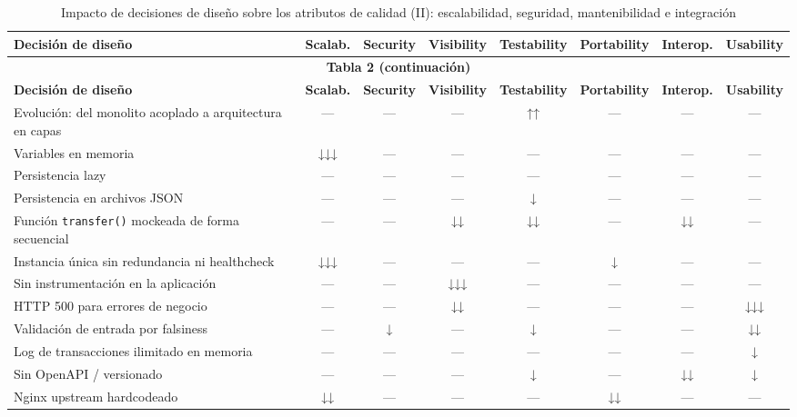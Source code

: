 \begingroup
\renewcommand*{\arraystretch}{1.2}
\setlength{\tabcolsep}{2.5pt}   %
\footnotesize                    %
\begin{longtable}{@{}l|c|c|c|c|c|c|c@{}}
\caption{Impacto de decisiones de diseño sobre los atributos de calidad (II): escalabilidad, seguridad, mantenibilidad e integración}\\
\toprule
\textbf{Decisión de diseño} & \textbf{Scalab.} & \textbf{Security} & \textbf{Visibility} & \textbf{Testability} & \textbf{Portability} & \textbf{Interop.} & \textbf{Usability} \\
\midrule
\endfirsthead
\multicolumn{8}{c}{{\bfseries Tabla 2 (continuación)}} \\
\toprule
\textbf{Decisión de diseño} & \textbf{Scalab.} & \textbf{Security} & \textbf{Visibility} & \textbf{Testability} & \textbf{Portability} & \textbf{Interop.} & \textbf{Usability} \\
\midrule
\endhead
\bottomrule
\endfoot
Evolución: del monolito acoplado a arquitectura en capas & — & — & — & ↑↑ & — & — & — \\
Variables en memoria & ↓↓↓ & — & — & — & — & — & — \\
Persistencia lazy & — & — & — & — & — & — & — \\
Persistencia en archivos JSON & — & — & — & ↓ & — & — & — \\
Función \texttt{transfer()} mockeada de forma secuencial & — & — & ↓↓ & ↓↓ & — & ↓↓ & — \\
Instancia única sin redundancia ni healthcheck & ↓↓↓ & — & — & — & ↓ & — & — \\
Sin instrumentación en la aplicación & — & — & ↓↓↓ & — & — & — & — \\
HTTP 500 para errores de negocio & — & — & ↓↓ & — & — & — & ↓↓↓ \\
Validación de entrada por falsiness & — & ↓ & — & ↓ & — & — & ↓↓ \\
Log de transacciones ilimitado en memoria & — & — & — & — & — & — & ↓ \\
Sin OpenAPI / versionado & — & — & — & ↓ & — & ↓↓ & ↓ \\
Nginx upstream hardcodeado & ↓↓ & — & — & — & ↓↓ & — & — \\
\end{longtable}
\endgroup